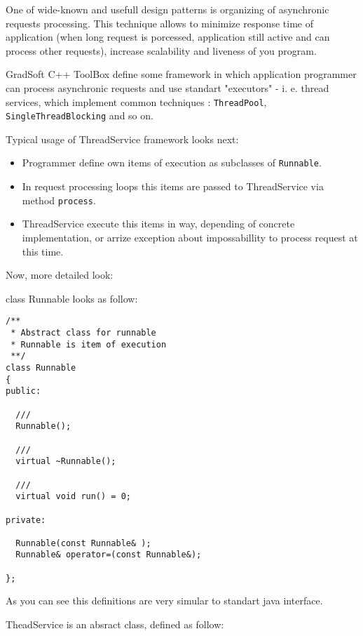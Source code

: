 \documentclass[10pt]{article}
\begin{document}
  One of wide-known and usefull design patterns is organizing of asynchronic
requests processing. This technique allows to minimize response time of application (when long request is porcessed, application still active and can process
other requests), increase scalability and liveness of you program.
 
  GradSoft C++ ToolBox define some framework in which application programmer
can process asynchronic requests and use standart "executors" - i. e. thread
services, which implement common techniques : \verb|ThreadPool|, \verb|SingleThreadBlocking| and so on.

  Typical usage of ThreadService framework looks next:

\begin{itemize}
 \item Programmer define own items of execution as subclasses of \verb|Runnable|. 
 \item In request processing loops this items are passed to ThreadService via
  method \verb|process|.
 \item ThreadService execute this items in way, depending of concrete implementation, or arrize exception about impossabillity to process request at this time.
\end{itemize}
  
 Now, more detailed look:

class Runnable looks as follow:
\begin{verbatim}
/**
 * Abstract class for runnable
 * Runnable is item of execution
 **/
class Runnable
{
public:

  ///
  Runnable();

  ///
  virtual ~Runnable();

  ///
  virtual void run() = 0;

private:

  Runnable(const Runnable& );
  Runnable& operator=(const Runnable&);

};
\end{verbatim}

 As you can see this definitions are very simular to standart java interface.

TheadService is an absract class, defined as follow:
\end{document}
